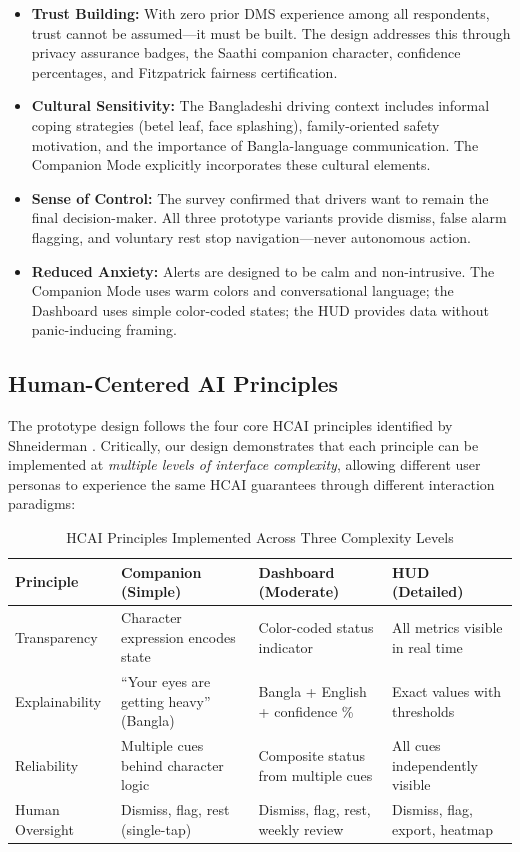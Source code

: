 \documentclass[sigconf]{acmart}
\begin{document}
\begin{itemize}
    \item \textbf{Trust Building:} With zero prior DMS experience among all respondents, trust cannot be assumed---it must be built. The design addresses this through privacy assurance badges, the Saathi companion character, confidence percentages, and Fitzpatrick fairness certification.
    \item \textbf{Cultural Sensitivity:} The Bangladeshi driving context includes informal coping strategies (betel leaf, face splashing), family-oriented safety motivation, and the importance of Bangla-language communication. The Companion Mode explicitly incorporates these cultural elements.
    \item \textbf{Sense of Control:} The survey confirmed that drivers want to remain the final decision-maker. All three prototype variants provide dismiss, false alarm flagging, and voluntary rest stop navigation---never autonomous action.
    \item \textbf{Reduced Anxiety:} Alerts are designed to be calm and non-intrusive. The Companion Mode uses warm colors and conversational language; the Dashboard uses simple color-coded states; the HUD provides data without panic-inducing framing.
\end{itemize}

\subsection{Human-Centered AI Principles}

The prototype design follows the four core HCAI principles identified by Shneiderman \cite{ref14}. Critically, our design demonstrates that each principle can be implemented at \textit{multiple levels of interface complexity}, allowing different user personas to experience the same HCAI guarantees through different interaction paradigms:

\begin{table}[h]
\centering
\caption{HCAI Principles Implemented Across Three Complexity Levels}
\label{tab:hcai_features}
\small
\begin{tabular}{|p{1.5cm}|p{2cm}|p{2cm}|p{2cm}|}
\hline
\textbf{Principle} & \textbf{Companion (Simple)} & \textbf{Dashboard (Moderate)} & \textbf{HUD (Detailed)} \\
\hline
Transparency & Character expression encodes state & Color-coded status indicator & All metrics visible in real time \\
\hline
Explainability & ``Your eyes are getting heavy'' (Bangla) & Bangla + English + confidence \% & Exact values with thresholds \\
\hline
Reliability & Multiple cues behind character logic & Composite status from multiple cues & All cues independently visible \\
\hline
Human Oversight & Dismiss, flag, rest (single-tap) & Dismiss, flag, rest, weekly review & Dismiss, flag, export, heatmap \\
\hline
\end{tabular}
\end{table}
\end{document}
